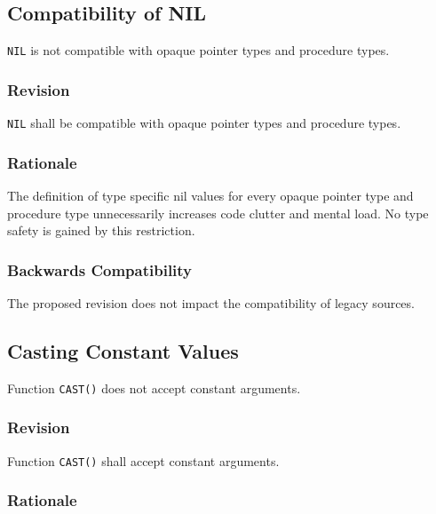 \documentclass[10pt,a4paper,leqno,fleqn]{article}
\begin{document}
\subsection{Compatibility of NIL}

\verb|NIL| is not compatible with opaque pointer types and procedure types.

\subsubsection{Revision}

\verb|NIL| shall be compatible with opaque pointer types and procedure types.

\subsubsection{Rationale}

The definition of type specific nil values for every opaque pointer type and
procedure type unnecessarily increases code clutter and mental load.
No type safety is gained by this restriction.

\subsubsection{Backwards Compatibility}

The proposed revision does not impact the compatibility of legacy sources.


\subsection{Casting Constant Values}

Function \verb|CAST()| does not accept constant arguments.

\subsubsection{Revision}

Function \verb|CAST()| shall accept constant arguments.

\subsubsection{Rationale}
\end{document}
